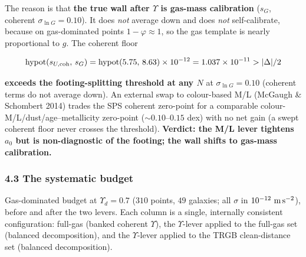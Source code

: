 \documentclass[
]{article}
\begin{document}
The reason is that \textbf{the true wall after \(\Upsilon\) is gas-mass
calibration} (\(s_G\), coherent \(\sigma_{\ln G}=0.10\)). It does
\emph{not} average down and does \emph{not} self-calibrate, because on
gas-dominated points \(1-\varphi\approx1\), so the gas template is
nearly proportional to \(g\). The coherent floor

\[\mathrm{hypot}(s_{U,\rm coh},\,s_G)=\mathrm{hypot}(5.75,\,8.63)\times10^{-12}=1.037\times10^{-11}>|\Delta|/2\]

\textbf{exceeds the footing-splitting threshold at any \(N\)} at
\(\sigma_{\ln G}=0.10\) (coherent terms do not average down). An
external swap to colour-based M/L (McGaugh \& Schombert 2014) trades the
SPS coherent zero-point for a comparable
colour-M/L/dust/age--metallicity zero-point (\(\sim0.10\)--\(0.15\) dex)
with no net gain (a swept coherent floor never crosses the threshold).
\textbf{Verdict: the M/L lever tightens \(a_0\) but is non-diagnostic of
the footing; the wall shifts to gas-mass calibration.}

\subsubsection{4.3 The systematic budget}\label{the-systematic-budget}

Gas-dominated budget at \(\Upsilon_d=0.7\) (\(310\) points, \(49\)
galaxies; all \(\sigma\) in \(10^{-12}\ {\rm m\,s^{-2}}\)), before and
after the two levers. Each column is a single, internally consistent
configuration: full-gas (banked coherent \(\Upsilon\)), the
\(\Upsilon\)-lever applied to the full-gas set (balanced decomposition),
and the \(\Upsilon\)-lever applied to the TRGB clean-distance set
(balanced decomposition).
\end{document}
